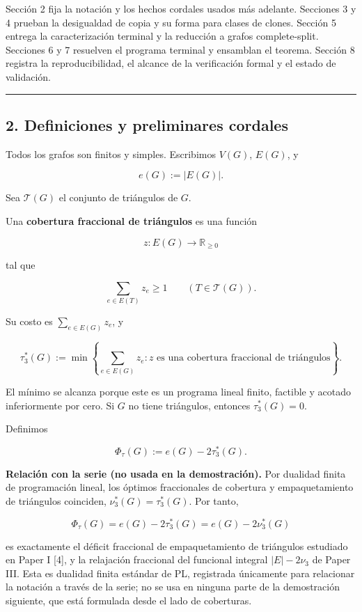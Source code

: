 \documentclass[
  spanish,
  11pt,
  a4paper,
]{article}
\begin{document}
Sección 2 fija la notación y los hechos cordales usados más adelante. Secciones 3 y 4 prueban la desigualdad de copia y su forma para clases de clones. Sección 5 entrega la caracterización terminal y la reducción a grafos complete-split. Secciones 6 y 7 resuelven el programa terminal y ensamblan el teorema. Sección 8 registra la reproducibilidad, el alcance de la verificación formal y el estado de validación.

\begin{center}\rule{0.5\linewidth}{0.5pt}\end{center}

\subsection{2. Definiciones y preliminares cordales}\label{definiciones-y-preliminares-cordales}

Todos los grafos son finitos y simples. Escribimos \(V(G)\), \(E(G)\), y

\[
e(G):=|E(G)|.
\]

Sea \(\mathcal T(G)\) el conjunto de triángulos de \(G\).

Una \textbf{cobertura fraccional de triángulos} es una función

\[
z:E(G)\longrightarrow\mathbb R_{\ge0}
\]

tal que

\[
\sum_{e\in E(T)}z_e\ge1
\qquad
(T\in\mathcal T(G)).
\]

Su costo es \(\sum_{e\in E(G)}z_e\), y

\[
\tau_3^*(G)
:=
\min\left\{
\sum_{e\in E(G)}z_e:
z\text{ es una cobertura fraccional de triángulos}
\right\}.
\]

El mínimo se alcanza porque este es un programa lineal finito, factible y acotado inferiormente por cero. Si \(G\) no tiene triángulos, entonces \(\tau_3^*(G)=0\).

Definimos

\[
\Phi_\tau(G):=e(G)-2\tau_3^*(G).
\]

\textbf{Relación con la serie (no usada en la demostración).} Por dualidad finita de programación lineal, los óptimos fraccionales de cobertura y empaquetamiento de triángulos coinciden, \(\nu_3^*(G)=\tau_3^*(G)\). Por tanto,

\[
\Phi_\tau(G)=e(G)-2\tau_3^*(G)=e(G)-2\nu_3^*(G)
\]

es exactamente el déficit fraccional de empaquetamiento de triángulos estudiado en Paper I {[}4{]}, y la relajación fraccional del funcional integral \(|E|-2\nu_3\) de Paper III. Esta es dualidad finita estándar de PL, registrada únicamente para relacionar la notación a través de la serie; no se usa en ninguna parte de la demostración siguiente, que está formulada desde el lado de coberturas.
\end{document}

